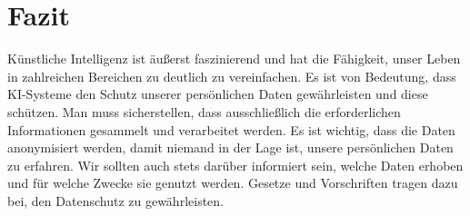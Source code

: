 \documentclass{report}
\begin{document}
\section{Fazit}
Künstliche Intelligenz ist äußerst faszinierend und hat die Fähigkeit, unser Leben in zahlreichen Bereichen zu deutlich zu vereinfachen.
Es ist von Bedeutung, dass KI-Systeme den Schutz unserer persönlichen Daten gewährleisten und diese schützen.
Man muss sicherstellen, dass ausschließlich die erforderlichen Informationen gesammelt und verarbeitet werden. Es ist wichtig, dass die Daten anonymisiert werden, damit niemand in der Lage ist, unsere persönlichen Daten zu erfahren. Wir sollten auch stets darüber informiert sein, welche Daten erhoben und für welche Zwecke sie genutzt werden.
Gesetze und Vorschriften tragen dazu bei, den Datenschutz zu gewährleisten.
\end{document}
